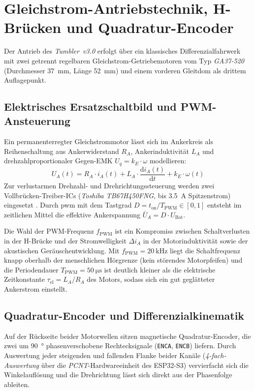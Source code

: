 \section{Gleichstrom-Antriebstechnik, H-Brücken und Quadratur-Encoder}
\label{sec:antrieb_grundlagen}
Der Antrieb des \emph{Tumbler~v3.0} erfolgt über ein klassisches Differenzialfahrwerk mit zwei getrennt regelbaren Gleichstrom-Getriebemotoren vom Typ \emph{GA37-520} (Durchmesser \qty{37}{\milli\meter}, Länge \qty{52}{\milli\meter}) und einem vorderen Gleitdom als drittem Auflagepunkt.

\subsection{Elektrisches Ersatzschaltbild und PWM-Ansteuerung}
Ein permanenterregter Gleichstrommotor lässt sich im Ankerkreis als Reihenschaltung aus Ankerwiderstand $R_A$, Ankerinduktivität $L_A$ und drehzahlproportionaler Gegen-EMK $U_q = k_E \cdot \omega$ modellieren:
\begin{equation}
  U_A(t) = R_A \cdot i_A(t) + L_A \cdot \frac{\mathrm{d}i_A(t)}{\mathrm{d}t} + k_E \cdot \omega(t)
  \label{eq:dc_motor}
\end{equation}
Zur verlustarmen Drehzahl- und Drehrichtungssteuerung werden zwei Vollbrücken-Treiber-ICs (\emph{Toshiba TB67H450FNG}, bis \qty{3,5}{\ampere} Spitzenstrom) eingesetzt \cite{Toshiba_TB67H450}. Durch \gls{pwm} mit dem Tastgrad $D = t_{\mathrm{on}} / T_{\mathrm{PWM}} \in [0, 1]$ entsteht im zeitlichen Mittel die effektive Ankerspannung $\bar{U}_A = D \cdot U_{\mathrm{Bat}}$.

Die Wahl der PWM-Frequenz $f_{\mathrm{PWM}}$ ist ein Kompromiss zwischen Schaltverlusten in der H-Brücke und der Stromwelligkeit $\Delta i_A$ in der Motorinduktivität sowie der akustischen Geräuschentwicklung. Mit $f_{\mathrm{PWM}} = \qty{20}{\kilo\hertz}$ liegt die Schaltfrequenz knapp oberhalb der menschlichen Hörgrenze (kein störendes Motorpfeifen) und die Periodendauer $T_{\mathrm{PWM}} = \qty{50}{\micro\second}$ ist deutlich kleiner als die elektrische Zeitkonstante $\tau_{\mathrm{el}} = L_A / R_A$ des Motors, sodass sich ein gut geglätteter Ankerstrom einstellt.

\subsection{Quadratur-Encoder und Differenzialkinematik}
Auf der Rückseite beider Motorwellen sitzen magnetische Quadratur-Encoder, die zwei um \qty{90}{\degree} phasenverschobene Rechtecksignale (\texttt{ENCA}, \texttt{ENCB}) liefern. Durch Auswertung jeder steigenden und fallenden Flanke beider Kanäle (\emph{4-fach-Auswertung} über die \emph{PCNT}-Hardwareeinheit des ESP32-S3) vervierfacht sich die Winkelauflösung und die Drehrichtung lässt sich direkt aus der Phasenfolge ableiten.

